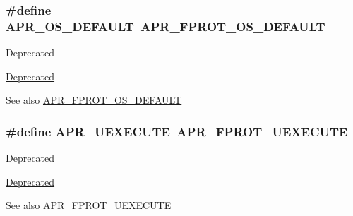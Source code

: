 \subsubsection[{\texorpdfstring{A\+P\+R\+\_\+\+O\+S\+\_\+\+D\+E\+F\+A\+U\+LT}{APR_OS_DEFAULT}}]{\setlength{\rightskip}{0pt plus 5cm}\#define A\+P\+R\+\_\+\+O\+S\+\_\+\+D\+E\+F\+A\+U\+LT~{\bf A\+P\+R\+\_\+\+F\+P\+R\+O\+T\+\_\+\+O\+S\+\_\+\+D\+E\+F\+A\+U\+LT}}\hypertarget{group__apr__file__permissions_ga8552adb50d545d5fc7faeabb4f4a388f}{}\label{group__apr__file__permissions_ga8552adb50d545d5fc7faeabb4f4a388f}
\begin{DoxyRefDesc}{Deprecated}
\item[\hyperlink{deprecated__deprecated000015}{Deprecated}]\end{DoxyRefDesc}
\begin{DoxySeeAlso}{See also}
\hyperlink{group__apr__file__permissions_gad3c65a67ee6eb12ecc6a33857397900b}{A\+P\+R\+\_\+\+F\+P\+R\+O\+T\+\_\+\+O\+S\+\_\+\+D\+E\+F\+A\+U\+LT} 
\end{DoxySeeAlso}
\subsubsection[{\texorpdfstring{A\+P\+R\+\_\+\+U\+E\+X\+E\+C\+U\+TE}{APR_UEXECUTE}}]{\setlength{\rightskip}{0pt plus 5cm}\#define A\+P\+R\+\_\+\+U\+E\+X\+E\+C\+U\+TE~{\bf A\+P\+R\+\_\+\+F\+P\+R\+O\+T\+\_\+\+U\+E\+X\+E\+C\+U\+TE}}\hypertarget{group__apr__file__permissions_ga4c08d7e798ab4022e31ed70f06f202b5}{}\label{group__apr__file__permissions_ga4c08d7e798ab4022e31ed70f06f202b5}
\begin{DoxyRefDesc}{Deprecated}
\item[\hyperlink{deprecated__deprecated000006}{Deprecated}]\end{DoxyRefDesc}
\begin{DoxySeeAlso}{See also}
\hyperlink{group__apr__file__permissions_ga156e1374a4ef30e745340d8c20b36d03}{A\+P\+R\+\_\+\+F\+P\+R\+O\+T\+\_\+\+U\+E\+X\+E\+C\+U\+TE} 
\end{DoxySeeAlso}
